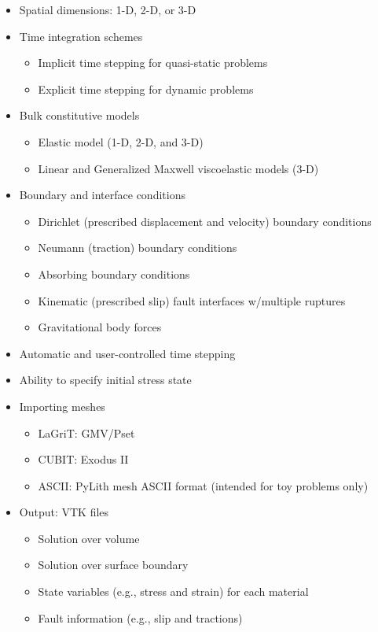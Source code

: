 \documentclass[pdftex,cig,slideColor]{pp4slides}
\begin{document}
  \summary{}

  \begin{itemize}
  \item Spatial dimensions: 1-D, 2-D, or 3-D
  \item Time integration schemes
    \begin{itemize}
    \item Implicit time stepping for quasi-static problems
    \item Explicit time stepping for dynamic problems
    \end{itemize}
  \item Bulk constitutive models
    \begin{itemize}
    \item Elastic model (1-D, 2-D, and 3-D)
    \item Linear and Generalized Maxwell viscoelastic models (3-D)
    \end{itemize}
  \item Boundary and interface conditions
    \begin{itemize}
    \item Dirichlet (prescribed displacement and velocity) boundary conditions
    \item Neumann (traction) boundary conditions
    \item Absorbing boundary conditions
    \item Kinematic (prescribed slip) fault interfaces w/multiple ruptures
    \item Gravitational body forces
    \end{itemize}
  \end{itemize}

  \summary{}

  \begin{itemize}
  \item Automatic and user-controlled time stepping
  \item Ability to specify initial stress state
  \item Importing meshes
    \begin{itemize}
    \item LaGriT: GMV/Pset
    \item CUBIT: Exodus II
    \item ASCII: PyLith mesh ASCII format (intended for toy problems only)
    \end{itemize}
  \item Output: VTK files
    \begin{itemize}
    \item Solution over volume
    \item Solution over surface boundary
    \item State variables (e.g., stress and strain) for each material
    \item Fault information (e.g., slip and tractions)
    \end{itemize}
  \end{itemize}
\end{document}
